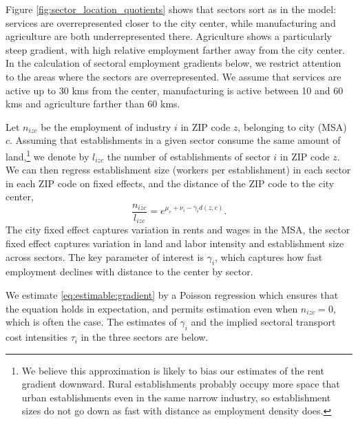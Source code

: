 \documentclass[12pt]{article}
\begin{document}
Figure \ref{fig:sector_location_quotients} shows that sectors sort as in the model: services are overrepresented closer to the city center, while manufacturing and agriculture are both underrepresented there. Agriculture shows a particularly steep gradient, with high relative employment farther away from the city center. In the calculation of sectoral employment gradients below, we restrict attention to the areas where the sectors are overrepresented. We assume that services are active up to 30 kms from the center, manufacturing is active between 10 and 60 kms and agriculture farther than 60 kms.

Let $n_{izc}$ be the employment of industry $i$ in ZIP code $z$, belonging to city (MSA) $c$.  Assuming that establishments in a given sector consume the same amount of land,\footnote{We believe this approximation is likely to bias our estimates of the rent gradient downward. Rural establishments probably occupy more space that urban establishments even in the same narrow industry, so establishment sizes do not go down as fast with distance as employment density does. } we denote by $l_{izc}$ the number of establishments of sector $i$ in ZIP code $z$. We can then regress establishment size (workers per establishment) in each sector in each ZIP code on fixed effects, and the distance of the ZIP code to the city center,
\begin{equation}\label{eq:estimable:gradient}
\frac{n_{izc}}{l_{izc}} = e^{\mu_c+\nu_i-\gamma_i d(z,c)}.
\end{equation}
The city fixed effect captures variation in rents and wages in the MSA, the sector fixed effect captures variation in land and labor intensity and establishment size across sectors. %
The key parameter of interest is $\gamma_i$, which captures how fast employment declines with distance to the center by sector.

We estimate \eqref{eq:estimable:gradient} by a Poisson regression which ensures that the equation holds in expectation, and permits estimation even when $n_{izc}=0$, which is often the case. The estimates of $\gamma_i$ and the implied sectoral transport cost intensities $\tau_i$ in the three sectors are below.
\end{document}
